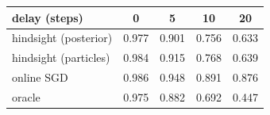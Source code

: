 \begin{tabular}{lcccc}
\toprule
delay (steps) & 0 & 5 & 10 & 20 \\
\midrule
hindsight (posterior) & 0.977 & 0.901 & 0.756 & 0.633 \\
hindsight (particles) & 0.984 & 0.915 & 0.768 & 0.639 \\
online SGD & 0.986 & 0.948 & 0.891 & 0.876 \\
oracle & 0.975 & 0.882 & 0.692 & 0.447 \\
\bottomrule
\end{tabular}
